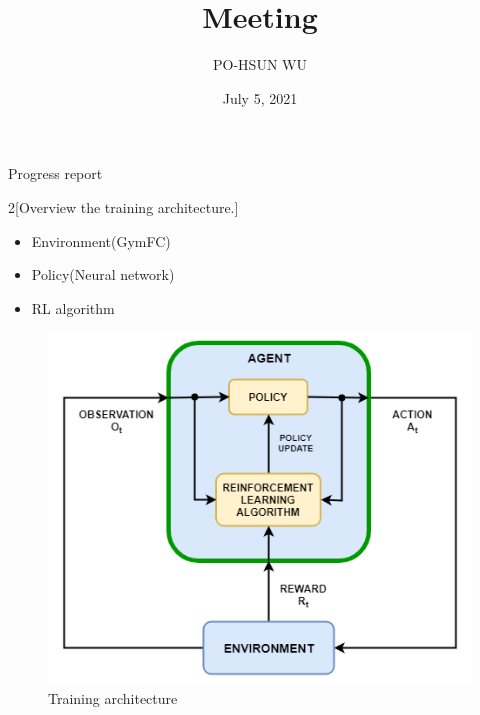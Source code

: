 \documentclass{beamer}
\date{July 5, 2021}
\title{Meeting}
\author{PO-HSUN WU}
\begin{document}
    \frame{\titlepage}

    \begin{frame}{Progress report}
    \begin{multicols}{2}[Overview the training architecture.]
        \null
        \begin{itemize}
            \item \small Environment(GymFC)
            \item \small Policy(Neural network)
            \item \small RL algorithm
        \end{itemize}
        \vfill \null
        \columnbreak
        \begin{figure}
            \centering
            \includegraphics[scale=.3]{agent_diagram.png}
            \caption{Training architecture}
        \end{figure}
    \end{multicols}
    \end{frame}
\end{document}
